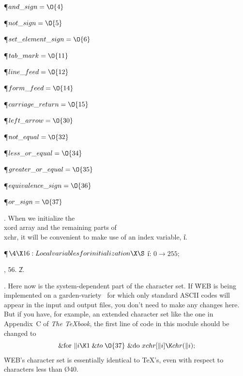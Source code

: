 \Y\P\D {}$\\{and\_sign}=\O{4}$\par
\P\D {}$\\{not\_sign}=\O{5}$\par
\P\D {}$\\{set\_element\_sign}=\O{6}$\par
\P\D {}$\\{tab\_mark}=\O{11}$\par
\P\D {}$\\{line\_feed}=\O{12}$\par
\P\D {}$\\{form\_feed}=\O{14}$\par
\P\D {}$\\{carriage\_return}=\O{15}$\par
\P\D {}$\\{left\_arrow}=\O{30}$\par
\P\D {}$\\{not\_equal}=\O{32}$\par
\P\D {}$\\{less\_or\_equal}=\O{34}$\par
\P\D {}$\\{greater\_or\_equal}=\O{35}$\par
\P\D {}$\\{equivalence\_sign}=\O{36}$\par
\P\D {}$\\{or\_sign}=\O{37}$\par
\fi

. When we initialize the \\{xord} array and the remaining parts of %
\\{xchr},
it will be convenient to make use of an index variable, \|i.

\Y\P$\4\X16:Local variables for initialization\X\S$\6
\4\|i: $0\to255$;\par
{}, 56.
\U2\*.\fi

. Here now is the system-dependent part of the character set.
If \.{WEB} is being implemented on a garden-variety \PASCAL\ for which
only standard ASCII codes will appear in the input and output files, you
don't need to make any changes here. But if you have, for example, an extended
character set like the one in Appendix~C of {\sl The \TeX book}, the first
line of code in this module should be changed to
$$\hbox{ \&{for} $\|i\K1\mathrel{\&{to}}\O{37}$ \&{do} $\\{xchr}[\|i]\K\\{chr}(%
\|i)$;}$$
\.{WEB}'s character set is essentially identical to \TeX's, even with respect
to
characters less than \O{40}.

